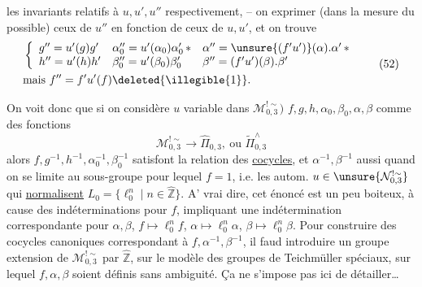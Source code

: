 
les invariants relatifs à $u,u',u''$ respectivement, -- on  exprimer (dans la mesure du possible) ceux de $u''$ en fonction de ceux de $u,u'$, et on trouve
\[
\begin{aligned}
&\left\{\begin{array}{lll}
g''=u'(g)g' & \alpha_0''=u'(\alpha_0)\alpha_0'\, {*} & \alpha''=\unsure{(f'u')}(\alpha).\alpha'\, {*}\\
h''=u'(h)h' & \beta_0''=u'(\beta_0)\beta_0' & \beta''=(f'u')(\beta).\beta'
\end{array}\right.\\
&\text{mais } f''=f'u'(f)\deleted{\illegible{1}}.
\end{aligned}
\tag{52}
\]

On voit donc que si on considère  $u$ variable dans $\mathcal M_{0,3}^{!\sim})$ $f,g,h,\alpha_0,\beta_0,\alpha,\beta$ comme des fonctions
\[
\mathcal M_{0,3}^{!\sim}\longrightarrow\widehat{\Pi}_{0,3},\ \text{ou }\widetilde{\Pi}_{0,3}^{\wedge}
\]
alors $f,g^{-1},h^{-1},\alpha_0^{-1},\beta_0^{-1}$ satisfont la relation des \uline{cocycles}, et $\alpha^{-1},\beta^{-1}$ aussi quand on se limite au sous-groupe pour lequel $f=1$, i.e. les autom. $u\in\unsure{\mathcal N_{0,3}^{!\sim}}$ qui \uline{normalisent}  $L_0=\{\ell_0^n\mid n\in\widehat{\mathbb Z}\}$. A' vrai dire, cet énoncé  est un peu boiteux, à cause des indéterminations pour $f$, impliquant une indétermination correspondante pour $\alpha,\beta$, $f\mapsto\ell_0^n f$, $\alpha\mapsto\ell_0^n\alpha$, $\beta\mapsto\ell_0^n\beta$. Pour construire des cocycles canoniques correspondant à $f,\alpha^{-1},\beta^{-1}$, il faud introduire un groupe extension de $\mathcal M_{0,3}^{!\sim}$ par $\widehat{\mathbb Z}$, sur le modèle des groupes de Teichmüller spéciaux, sur lequel $f,\alpha,\beta$ soient définis sans ambiguité. Ça ne s'impose pas ici de détailler\ldots


